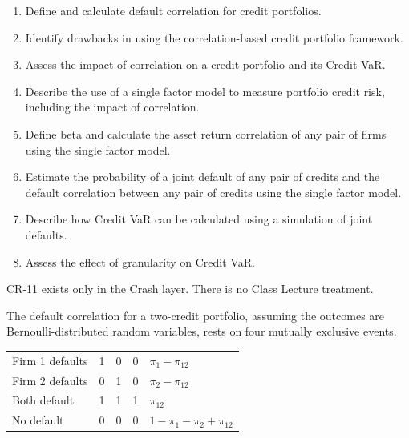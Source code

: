 
\begin{crkeybox}
\begin{enumerate}[label=\textbf{\alph*.},leftmargin=2em]
\item Define and calculate default correlation for credit portfolios.
\item Identify drawbacks in using the correlation-based credit portfolio framework.
\item Assess the impact of correlation on a credit portfolio and its Credit VaR.
\item Describe the use of a single factor model to measure portfolio credit risk, including the impact of correlation.
\item Define beta and calculate the asset return correlation of any pair of firms using the single factor model.
\item Estimate the probability of a joint default of any pair of credits and the default correlation between any pair of credits using the single factor model.
\item Describe how Credit VaR can be calculated using a simulation of joint defaults.
\item Assess the effect of granularity on Credit VaR.
\end{enumerate}
\end{crkeybox}

\begin{crtrapbox}
CR-11 exists only in the Crash layer. There is no Class Lecture treatment.
\end{crtrapbox}


The default correlation for a two-credit portfolio, assuming the outcomes are
Bernoulli-distributed random variables, rests on four mutually exclusive events.

\begin{center}
\footnotesize
\begin{tabular}{L{4.0cm} c c c L{3.6cm}}
\toprule
{} &  &  &  &
 \\
\midrule
Firm 1 defaults & 1 & 0 & 0 & $\pi_1 - \pi_{12}$ \\
Firm 2 defaults & 0 & 1 & 0 & $\pi_2 - \pi_{12}$ \\
Both default & 1 & 1 & 1 & $\pi_{12}$ \\
No default & 0 & 0 & 0 & $1 - \pi_1 - \pi_2 + \pi_{12}$ \\
\bottomrule
\end{tabular}
\end{center}

